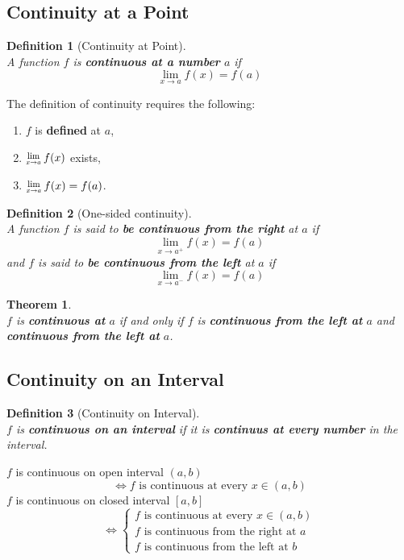 \documentclass[12pt]{article}
\newcommand{\Lim}[1]{\raisebox{0.5ex}{\scalebox{0.8}{$\displaystyle \lim_{#1}\;$}}}
\newtheorem{definition}{Definition}[section]
\newtheorem{theorem}{Theorem}[section]
\theoremstyle{definition}
\begin{document}
\subsection{Continuity at a Point}
\begin{definition}[Continuity at Point]
\hfill\\
\normalfont A function $f$ is \textbf{continuous at a number} $a$ if
\[
\lim_{x\to a}f(x)=f(a)
\]
\end{definition}
The definition of continuity requires the following:
\begin{enumerate}
\item $f$ is \textbf{defined} at $a$,
\item $\Lim{x\to a}f(x)$ exists,
\item $\Lim{x\to a}f(x)=f(a)$.
\end{enumerate}
\begin{definition}[One-sided continuity]
\hfill\\
\normalfont A function $f$ is said to \textbf{be continuous from the right} at $a$ if
\[
\lim_{x\to a^{+}}f(x)=f(a)
\]
and $f$ is said to \textbf{be continuous from the left} at $a$ if
\[
\lim_{x\to a^{-}}f(x)=f(a)
\]
\end{definition}
\begin{theorem}
\hfill\\
\normalfont $f$ is \textbf{continuous at} $a$ \textit{if and only if} $f$ is \textbf{continuous from the left at }$a$ and \textbf{continuous from the left at} $a$.
\end{theorem}
\subsection{Continuity on an Interval}
\begin{definition}[Continuity on Interval]
\hfill\\
\normalfont $f$ is \textbf{continuous on an interval} if it is \textbf{continuus at every number} in the interval.
\end{definition}
$f$ is continuous on open interval $(a,b)$
\[
\Leftrightarrow f \text{ is continuous at every }x\in(a,b)
\]
$f$ is continuous on closed interval $[a,b]$
\[
\Leftrightarrow \begin{cases}
                  f\text{ is continuous at every }x\in(a,b)\\
                  f\text{ is continuous from the right at }a\\
                  f\text{ is continuous from the left at }b
                \end{cases}
\]
\end{document}

